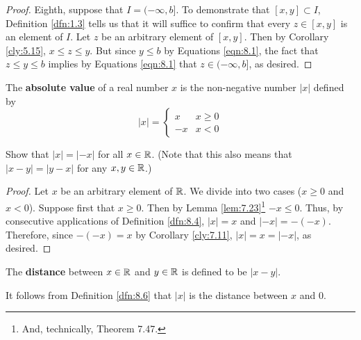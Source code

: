 \documentclass[../main.tex]{subfiles}
\begin{document}
\begin{lemma}
\begin{proof}
        Eighth, suppose that $I=(-\infty,b]$. To demonstrate that $[x,y]\subset I$, Definition \ref{dfn:1.3} tells us that it will suffice to confirm that every $z\in[x,y]$ is an element of $I$. Let $z$ be an arbitrary element of $[x,y]$. Then by Corollary \ref{cly:5.15}, $x\leq z\leq y$. But since $y\leq b$ by Equations \ref{eqn:8.1}, the fact that $z\leq y\leq b$ implies by Equations \ref{eqn:8.1} that $z\in(-\infty,b]$, as desired.
    \end{proof}
\end{lemma}

\begin{definition}\label{dfn:8.4}
    The \textbf{absolute value} of a real number $x$ is the non-negative number $|x|$ defined by
    \begin{equation*}
        |x| =
        \begin{cases}
            x & x\geq 0\\
            -x & x<0
        \end{cases}
    \end{equation*}
\end{definition}

\begin{exercise}\label{exr:8.5}
    Show that $|x|=|-x|$ for all $x\in\mathbb{R}$. (Note that this also means that $|x-y|=|y-x|$ for any $x,y\in\mathbb{R}$.)
    \begin{proof}
        Let $x$ be an arbitrary element of $\mathbb{R}$. We divide into two cases ($x\geq 0$ and $x<0$). Suppose first that $x\geq 0$. Then by Lemma \ref{lem:7.23}\footnote{And, technically, Theorem 7.47.} $-x\leq 0$. Thus, by consecutive applications of Definition \ref{dfn:8.4}, $|x|=x$ and $|-x|=-(-x)$. Therefore, since $-(-x)=x$ by Corollary \ref{cly:7.11}, $|x|=x=|-x|$, as desired.
    \end{proof}
\end{exercise}

\begin{definition}\label{dfn:8.6}
    The \textbf{distance} between $x\in\mathbb{R}$ and $y\in\mathbb{R}$ is defined to be $|x-y|$.
\end{definition}

\begin{remark}\label{rmk:8.7}
    It follows from Definition \ref{dfn:8.6} that $|x|$ is the distance between $x$ and $0$.
\end{remark}
\end{document}
